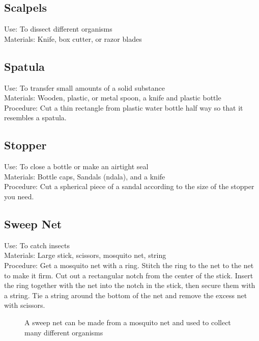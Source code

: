 \subsection*{Scalpels}


Use: To dissect different organisms \\
Materials: Knife, box cutter, or razor blades\\


\subsection*{Spatula}


Use: To transfer small amounts of a solid substance\\
Materials: Wooden, plastic, or metal spoon, a knife and plastic bottle\\
Procedure: Cut a thin rectangle from plastic water bottle half way so that it resembles a spatula.\\


\subsection*{Stopper}


Use: To close a bottle or make an airtight seal\\
Materials: Bottle caps, Sandals (ndala), and a knife\\
Procedure: Cut a spherical piece of a sandal according to the size of the stopper you need.\\


\subsection*{Sweep Net}


Use: To catch insects\\
Materials: Large stick, scissors, mosquito net, string\\
Procedure: Get a mosquito net with a ring. Stitch the ring to the net to the net to make it firm. Cut out a rectangular notch from the center of the stick. Insert the ring together with the net into the notch in the stick, then secure them with a string. Tie a string around the bottom of the net and remove the excess net with scissors.\\

\begin{figure}[H]
\begin{center}
\def\svgwidth{9cm}

\caption{A sweep net can be made from a mosquito net and used to collect many different organisms}
\label{fig:butterfly-net}
\end{center}
\end{figure}


